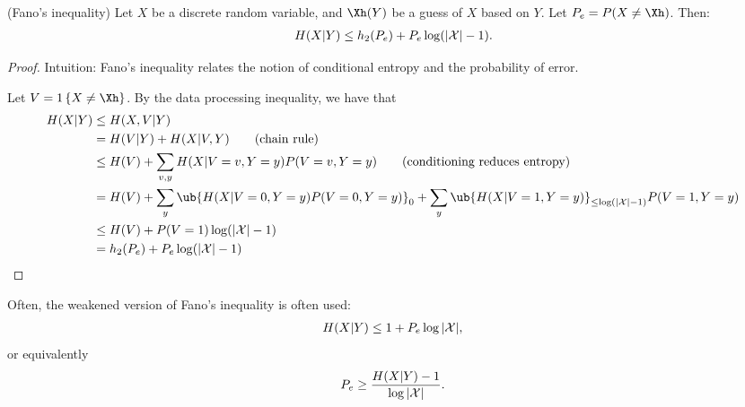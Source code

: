 \begin{theorem}
  (Fano's inequality) Let $X$ be a discrete random variable, and $\Xh(Y)$ be a guess of $X$ based on $Y$.  Let $P_e = P(X \neq \Xh)$.  Then:
  \begin{align*}
    H(X|Y) \leq h_2(P_e) + P_e \log (|\mathcal{X}| - 1).
  \end{align*}
\end{theorem}

\begin{proof}
  Intuition: Fano's inequality relates the notion of conditional entropy and the probability of error.

  Let $V = 1\left\{ X \neq \Xh \right\}$.  By the data processing inequality, we have that
  \begin{align*}
    H(X|Y) & \leq H(X, V | Y) \\
    &= H(V | Y) + H(X | V, Y) \tag{chain rule}\\
    & \leq H(V) + \sum_{v, y} H(X | V = v, Y = y) P(V=v, Y=y) \tag{conditioning reduces entropy} \\
    &= H(V) + \sum_{y} \ub{H(X | V = 0, Y = y) P (V = 0, Y = y)}_{0} + \sum_{y} \ub{H(X | V = 1, Y = y)}_{\leq \log (|\XX| - 1)} P(V = 1, Y = y) \\
    &\leq H(V) + P(V=1) \log (|\XX| - 1)  \\
    &= h_2(P_e) + P_e \log (|\XX| - 1)
  \end{align*}
\end{proof}

\begin{remark}
  Often, the weakened version of Fano's inequality is often used:
\begin{align*}
  H(X|Y) \leq 1 + P_e \log |\mathcal{X}|,
\end{align*}
or equivalently
\begin{align*}
  P_e \geq \frac{H(X|Y) -1}{\log |\mathcal{X}|}.
\end{align*}
\end{remark}


